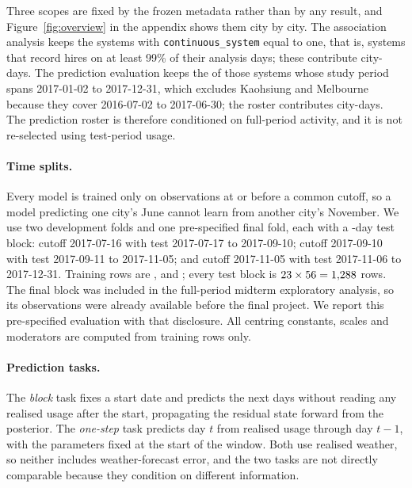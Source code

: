 \documentclass{article}
\begin{document}
Three scopes are fixed by the frozen metadata rather than by any result, and
Figure~\ref{fig:overview} in the appendix shows them city by city. The association analysis keeps
the \CityCount{} systems with \texttt{continuous\_system} equal to one, that is, systems that record
hires on at least 99\% of their analysis days; these contribute \PrimaryRows{} city-days. The
prediction evaluation keeps the \PredCityCount{} of those systems whose study period spans
2017-01-02 to 2017-12-31, which excludes Kaohsiung and Melbourne because they cover 2016-07-02 to
2017-06-30; the roster contributes \PredictionRows{} city-days. The prediction roster is therefore
conditioned on full-period activity, and it is not re-selected using test-period usage.

\paragraph{Time splits.}
Every model is trained only on observations at or before a common cutoff, so a model predicting one
city's June cannot learn from another city's November. We use two development folds and one
pre-specified final fold, each with a \BlockDays-day test block: cutoff 2017-07-16 with test
2017-07-17 to 2017-09-10; cutoff 2017-09-10 with test 2017-09-11 to 2017-11-05; and cutoff
2017-11-05 with test 2017-11-06 to 2017-12-31. Training rows are \DevOneTrain, \DevTwoTrain{} and
\FinalTrain; every test block is $23\times56=1{,}288$ rows. The final block was
included in the full-period midterm exploratory analysis, so its observations were already available
before the final project. We report this pre-specified evaluation with that disclosure. All centring
constants, scales and moderators are computed from training rows only.

\paragraph{Prediction tasks.}
The \emph{block} task fixes a start date and predicts the next \BlockDays{} days without reading any
realised usage after the start, propagating the residual state forward from the posterior. The
\emph{one-step} task predicts day $t$ from realised usage through day $t-1$, with the parameters
fixed at the start of the window. Both use realised weather, so neither includes weather-forecast
error, and the two tasks are not directly comparable because they condition on different information.
\end{document}
